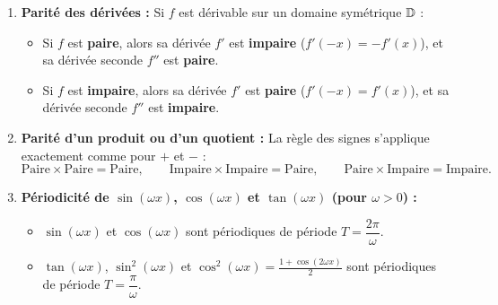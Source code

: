 \begin{theoreme}
\begin{enumerate}
    \item \textbf{Parité des dérivées :} Si $f$ est dérivable sur un domaine symétrique $\mathbb{D}$ :
    \begin{itemize}
        \item Si $f$ est \textbf{paire}, alors sa dérivée $f'$ est \textbf{impaire} ($f'(-x) = -f'(x)$), et sa dérivée seconde $f''$ est \textbf{paire}.
        \item Si $f$ est \textbf{impaire}, alors sa dérivée $f'$ est \textbf{paire} ($f'(-x) = f'(x)$), et sa dérivée seconde $f''$ est \textbf{impaire}.
    \end{itemize}
    \item \textbf{Parité d'un produit ou d'un quotient :} La règle des signes s'applique exactement comme pour $+$ et $-$ :
    \[
        \text{Paire} \times \text{Paire} = \text{Paire}, \qquad \text{Impaire} \times \text{Impaire} = \text{Paire}, \qquad \text{Paire} \times \text{Impaire} = \text{Impaire}.
    \]
    \item \textbf{Périodicité de $\sin(\omega x)$, $\cos(\omega x)$ et $\tan(\omega x)$ (pour $\omega > 0$) :}
    \begin{itemize}
        \item $\sin(\omega x)$ et $\cos(\omega x)$ sont périodiques de période $T = \dfrac{2\pi}{\omega}$.
        \item $\tan(\omega x)$, $\sin^2(\omega x)$ et $\cos^2(\omega x) = \frac{1+\cos(2\omega x)}{2}$ sont périodiques de période $T = \dfrac{\pi}{\omega}$.
    \end{itemize}
\end{enumerate}
\end{theoreme}

